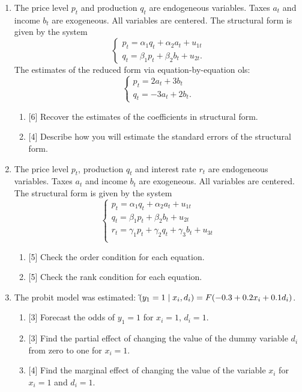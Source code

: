\documentclass[12pt]{article}
\let\P\relax
\DeclareMathOperator{\P}{\mathbb{P}}
\begin{document}
\begin{enumerate}
    \item The price level $p_t$ and production $q_t$ are endogeneous variables. 
    Taxes $a_t$ and income $b_t$ are exogeneous. 
    All variables are centered. 
    The structural form is given by the system
    \[
        \begin{cases}
            p_t = \alpha_1 q_t + \alpha_2 a_t + u_{1t} \\
            q_t = \beta_1 p_t + \beta_2 b_t + u_{2t}.
        \end{cases}        
    \]
    The estimates of the reduced form via equation-by-equation ols:
    \[
    \begin{cases}
        p_t = 2 a_t + 3 b_t \\
        q_t = - 3 a_t + 2 b_t.
    \end{cases}
    \]
    \begin{enumerate}
        \item {[6]} Recover the estimates of the coefficients in structural form.
        \item {[4]} Describe how you will estimate the standard errors of the structural form. 
    \end{enumerate}


    \item The price level $p_t$, production $q_t$ and interest rate $r_t$ are endogeneous variables. 
    Taxes $a_t$ and income $b_t$ are exogeneous. 
    All variables are centered. 
    The structural form is given by the system
    \[
        \begin{cases}
            p_t = \alpha_1 q_t + \alpha_2 a_t + u_{1t} \\
            q_t = \beta_1 p_t + \beta_2 b_t + u_{2t} \\
            r_t = \gamma_1 p_t + \gamma_2 q_t + \gamma_3 b_t + u_{3t} \\
        \end{cases}        
    \]
    \begin{enumerate}
        \item {[5]} Check the order condition for each equation. 
        \item {[5]} Check the rank condition for each equation.
    \end{enumerate}
    
    \newpage
    \item The probit model was estimated:
    $\hat\P(y_1 = 1 \mid x_i, d_i) = F(-0.3 + 0.2 x_i + 0.1 d_i)$.
    \begin{enumerate}
        \item {[3]} Forecast the odds of $y_1 = 1$ for $x_i = 1$, $d_i = 1$.
        \item {[3]} Find the partial effect of changing the value of the dummy variable $d_i$ from zero to one for $x_i = 1$.
        \item {[4]} Find the marginal effect of changing the value of the variable $x_i$ for $x_i = 1$ and $d_i = 1$.
    \end{enumerate}


\end{enumerate}
\end{document}
